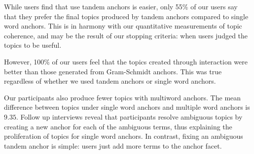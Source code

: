 While users find that use tandem anchors is easier, only 55\% of our users
say that they prefer the final topics produced by tandem anchors compared
to single word anchors.
This is in harmony with our quantitative measurements of topic coherence, and
may be the result of our stopping criteria: when users judged the topics to be
useful.

However, 100\% of our users feel that the topics created through interaction
were better than those generated from Gram-Schmidt anchors.
This was true regardless of whether we used tandem anchors or single word
anchors.

Our participants also produce fewer topics with multiword anchors.
The mean difference between topics under single word anchors and
multiple word anchors is $9.35$.
Follow up interviews reveal that participants resolve ambiguous topics
by creating a new anchor
for each of the ambiguous terms, thus explaining the proliferation of topics
for single word anchors.
In contrast, fixing an ambiguous tandem anchor is simple: users just add more
terms to the anchor facet.
